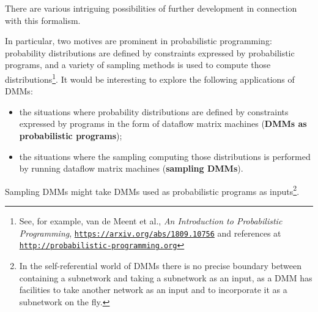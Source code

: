 \documentclass{article}
\begin{document}
There are various intriguing possibilities of further development in connection with this formalism.

In particular, two motives are prominent in probabilistic programming: probability distributions are defined
by constraints expressed by probabilistic programs, and a variety of sampling methods is used
to compute those distributions\footnote{See, for example, van  de Meent et al., {\em An Introduction to Probabilistic Programming}, 
\href{https://arxiv.org/abs/1809.10756}{\tt https://arxiv.org/abs/1809.10756} and references at \href{http://probabilistic-programming.org}{\tt http://probabilistic-programming.org} }.
It would be interesting to explore the following applications of DMMs:
  \begin{itemize}
      \item the situations where probability distributions are defined by
constraints expressed by programs in the form of dataflow matrix machines ({\bf DMMs as probabilistic programs});
     \item the situations where the sampling
computing those distributions is performed by running dataflow matrix machines ({\bf sampling DMMs}).
  \end{itemize}
Sampling DMMs might take  DMMs  used as probabilistic programs as inputs\footnote{In 
the self-referential world of DMMs there is no precise boundary between containing a subnetwork and taking a subnetwork as an input, as a DMM has facilities
to take another network as an input and to incorporate it as a subnetwork on the fly.}.
\end{document}
